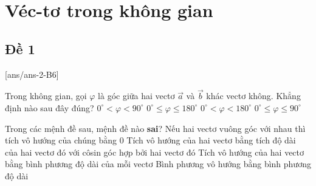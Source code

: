 \section{Véc-tơ trong không gian}
\subsection{Đề 1}
[ans/ans-2-B6]
\caulc
\begin{ex}%
	Trong không gian, gọi $\varphi$ là góc giữa hai vectơ  $\overrightarrow{a}$ và $\overrightarrow{b}$ khác vectơ không. Khẳng định nào sau đây đúng?
	\choice
	{$0^\circ <\varphi<90^\circ$}
	{\True $0^\circ \le \varphi\le 180^\circ$}
	{$0^\circ <\varphi<180^\circ$}
	{$0^\circ \le\varphi\le 90^\circ$}
\end{ex}
\begin{ex}%
	Trong các mệnh đề sau, mệnh đề nào \textbf{sai}?
	\choice
	{Nếu hai vectơ vuông góc với nhau thì tích vô hướng của chúng bằng $0$}
	{Tích vô hướng của hai vectơ bằng tích độ dài của hai vectơ đó với côsin góc hợp bởi hai vectơ đó}
	{\True Tích vô hướng của hai vectơ bằng bình phương độ dài của mỗi vectơ}
	{Bình phương vô hướng bằng bình phương độ dài}
\end{ex}
